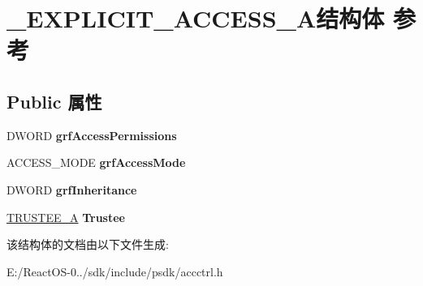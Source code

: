 \hypertarget{struct___e_x_p_l_i_c_i_t___a_c_c_e_s_s___a}{}\section{\+\_\+\+E\+X\+P\+L\+I\+C\+I\+T\+\_\+\+A\+C\+C\+E\+S\+S\+\_\+\+A结构体 参考}
\label{struct___e_x_p_l_i_c_i_t___a_c_c_e_s_s___a}
\subsection*{Public 属性}
\begin{DoxyCompactItemize}
\item 
\mbox{\label{struct___e_x_p_l_i_c_i_t___a_c_c_e_s_s___a_a077d86003241903edf937ef21d2a6fe5}} 
D\+W\+O\+RD {\bfseries grf\+Access\+Permissions}
\item 
\mbox{\label{struct___e_x_p_l_i_c_i_t___a_c_c_e_s_s___a_ab64edc667ac769912caa5268298d3e53}} 
A\+C\+C\+E\+S\+S\+\_\+\+M\+O\+DE {\bfseries grf\+Access\+Mode}
\item 
\mbox{\label{struct___e_x_p_l_i_c_i_t___a_c_c_e_s_s___a_a3eaca7798768460794feab8d7b1739fe}} 
D\+W\+O\+RD {\bfseries grf\+Inheritance}
\item 
\mbox{\label{struct___e_x_p_l_i_c_i_t___a_c_c_e_s_s___a_a095a5952d8b384f3ece299ddaffcf311}} 
\hyperlink{struct___t_r_u_s_t_e_e___a}{T\+R\+U\+S\+T\+E\+E\+\_\+A} {\bfseries Trustee}
\end{DoxyCompactItemize}


该结构体的文档由以下文件生成\+:\begin{DoxyCompactItemize}
\item 
E\+:/\+React\+O\+S-\/0../sdk/include/psdk/accctrl.\+h\end{DoxyCompactItemize}
